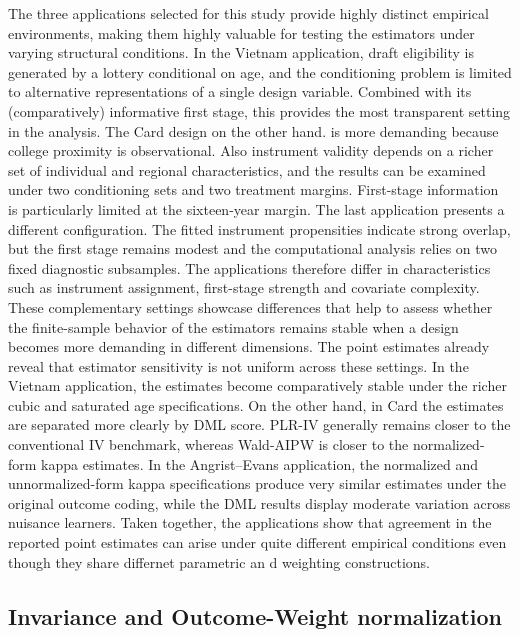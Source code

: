 \documentclass[12pt, a4paper, oneside]{article}
\theoremstyle{plain}
\theoremstyle{definition}
\begin{document}
The three applications selected for this study provide highly distinct empirical environments, making them highly valuable for testing the estimators under varying structural conditions.
In the Vietnam application, draft eligibility is generated by a lottery conditional on age,
and the conditioning problem is limited to alternative representations of a single design variable.
Combined with its (comparatively) informative first stage, this provides the most transparent setting in the analysis.
The Card design on the other hand. 
is more demanding because college proximity is observational.
Also instrument
validity depends on a richer set of individual and regional characteristics,
and the results can be examined under two conditioning sets and two treatment
margins. First-stage information is particularly limited at the sixteen-year
margin.
The last application presents a different configuration.
The fitted instrument propensities indicate strong overlap, but the first
stage remains modest and the computational analysis relies on two fixed
diagnostic subsamples. The applications therefore differ in characteristics such as instrument
assignment, first-stage strength and covariate complexity. 
These complementary settings showcase differences that help to assess  
whether the finite-sample behavior of the estimators remains stable
when a design becomes more demanding in different dimensions.
The point estimates already reveal that estimator sensitivity is not uniform
across these settings. In the Vietnam application, the estimates become
comparatively stable under the richer cubic and saturated age specifications. On the other hand, in Card the estimates are separated more clearly by DML score. PLR-IV
generally remains closer to the conventional IV benchmark, whereas Wald-AIPW
is closer to the normalized-form kappa estimates. 
In the Angrist--Evans
application, the normalized and unnormalized-form kappa specifications produce very
similar estimates under the original outcome coding, while the DML results
display moderate variation across nuisance learners. 
Taken together, the applications show that agreement in
the reported point estimates can arise under quite different empirical
conditions even though they share differnet parametric an d weighting constructions.




\subsection{ Invariance and Outcome-Weight normalization}
\label{subsec:diagnostic_synthesis}
\end{document}
